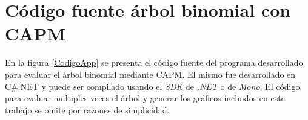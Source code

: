 

\appendix

\chapter{Código fuente árbol binomial con CAPM}\label{anexocodigoapp}


En la figura \eqref{CodigoApp} se presenta el código fuente del programa desarrollado para evaluar el árbol binomial mediante CAPM.
El mismo fue desarrollado en C\#.NET y puede ser compilado usando el \textit{SDK} de \textit{.NET} o de \textit{Mono}. El código para evaluar multiples veces el árbol y generar los gráficos incluidos en este trabajo se omite por razones de simplicidad.


\lstset{numbers=left, stepnumber=1, basicstyle=\footnotesize, frame=single, language=C++, 
	breaklines=true, breakatwhitespace=true, tabsize=2, showstringspaces=false,
	caption=Código fuente para el cálculo de un árbol binomial utilizando CAPM.,
	label=CodigoApp}

